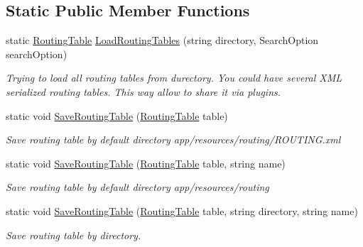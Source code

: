 \subsection*{Static Public Member Functions}
\begin{DoxyCompactItemize}
\item 
static \mbox{\hyperlink{class_pipes_provider_1_1_networking_1_1_routing_1_1_routing_table}{Routing\+Table}} \mbox{\hyperlink{class_pipes_provider_1_1_networking_1_1_routing_1_1_routing_table_a13c2778abb1d14e7e8e4a2ae51d315ac}{Load\+Routing\+Tables}} (string directory, Search\+Option search\+Option)
\begin{DoxyCompactList}\small\item\em Trying to load all routing tables from durectory. You could have several X\+ML serialized routing tables. This way allow to share it via plugins. \end{DoxyCompactList}\item 
static void \mbox{\hyperlink{class_pipes_provider_1_1_networking_1_1_routing_1_1_routing_table_a28de144d3afcb29a69cd2a51b2af41a9}{Save\+Routing\+Table}} (\mbox{\hyperlink{class_pipes_provider_1_1_networking_1_1_routing_1_1_routing_table}{Routing\+Table}} table)
\begin{DoxyCompactList}\small\item\em Save routing table by default directory app/resources/routing/\+R\+O\+U\+T\+I\+NG.xml \end{DoxyCompactList}\item 
static void \mbox{\hyperlink{class_pipes_provider_1_1_networking_1_1_routing_1_1_routing_table_affae680ffe9710e88416323ef3aa8c0b}{Save\+Routing\+Table}} (\mbox{\hyperlink{class_pipes_provider_1_1_networking_1_1_routing_1_1_routing_table}{Routing\+Table}} table, string name)
\begin{DoxyCompactList}\small\item\em Save routing table by default directory app/resources/routing \end{DoxyCompactList}\item 
static void \mbox{\hyperlink{class_pipes_provider_1_1_networking_1_1_routing_1_1_routing_table_a1fe9c42819cd5c5210b254c0d868b336}{Save\+Routing\+Table}} (\mbox{\hyperlink{class_pipes_provider_1_1_networking_1_1_routing_1_1_routing_table}{Routing\+Table}} table, string directory, string name)
\begin{DoxyCompactList}\small\item\em Save routing table by directory. \end{DoxyCompactList}\item 

\end{DoxyCompactItemize}
